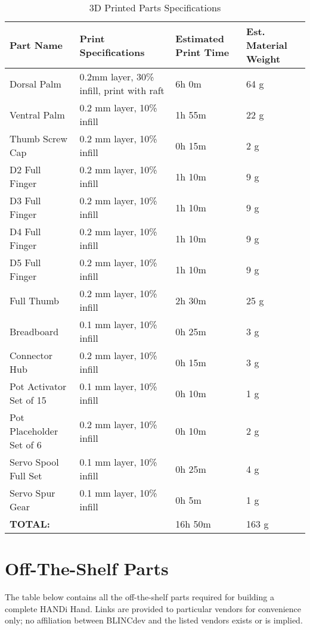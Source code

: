 \begin{table}[H]
\centering
\caption{3D Printed Parts Specifications}
\label{3d_printed_parts_list}
\begin{tabular}{|p{4cm}|p{4cm}|p{2cm}|p{2.5cm}|}
\hline
\textbf{Part Name} & \textbf{Print Specifications} & \textbf{Estimated Print Time} & \textbf{Est. Material Weight} \\ \hline
Dorsal Palm & 0.2mm layer, 30\% infill, print with raft & 6h 0m & 64 g \\ \hline
Ventral Palm & 0.2 mm layer, 10\% infill & 1h 55m & 22 g  \\ \hline
Thumb Screw Cap &0.2 mm layer, 10\% infill &0h 15m &2 g  \\ \hline
D2 Full Finger &0.2 mm layer, 10\% infill &1h 10m &9 g  \\ \hline
D3 Full Finger &0.2 mm layer, 10\% infill &1h 10m &9 g  \\ \hline
D4 Full Finger &0.2 mm layer, 10\% infill &1h 10m &9 g  \\ \hline
D5 Full Finger &0.2 mm layer, 10\% infill &1h 10m &9 g  \\ \hline
Full Thumb &0.2 mm layer, 10\% infill &2h 30m &25 g  \\ \hline
Breadboard &0.1 mm layer, 10\% infill &0h 25m &3 g  \\ \hline
Connector Hub &0.2 mm layer, 10\% infill &0h 15m &3 g  \\ \hline
Pot Activator Set of 15 &0.1 mm layer, 10\% infill &0h 10m &1 g  \\ \hline
Pot Placeholder Set of 6 &0.2 mm layer, 10\% infill &0h 10m &2 g  \\ \hline
Servo Spool Full Set &0.1 mm layer, 10\% infill &0h 25m &4 g  \\ \hline
Servo Spur Gear &0.1 mm layer, 10\% infill &0h 5m &1 g  \\ \hline
\textbf{TOTAL:}&\centering{-}  & 16h 50m & 163 g \\ \hline
\end{tabular}
\end{table} 


\section{Off-The-Shelf Parts}
The table below contains all the off-the-shelf parts required for building a complete HANDi Hand. Links are provided to particular vendors for convenience only; no affiliation between BLINCdev and the listed vendors exists or is implied.

